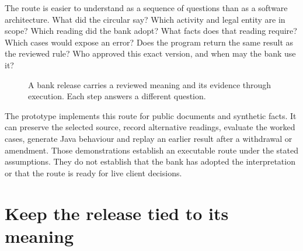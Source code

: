 The route is easier to understand as a sequence of questions than as a software
architecture. What did the circular say? Which activity and legal entity are in
scope? Which reading did the bank adopt? What facts does that reading require?
Which cases would expose an error? Does the program return the same result as the
reviewed rule? Who approved this exact version, and when may the bank use it?

\begin{figure}[htbp]
\centering
{}
\caption{A bank release carries a reviewed meaning and its evidence through
execution. Each step answers a different question.}
\label{fig:reader-implementation-route}
\end{figure}

The prototype implements this route for public documents and synthetic facts. It
can preserve the selected source, record alternative readings, evaluate the
worked cases, generate Java behaviour and replay an earlier result after a
withdrawal or amendment. Those demonstrations establish an executable route
under the stated assumptions. They do not establish that the bank has adopted
the interpretation or that the route is ready for live client decisions.

\section{Keep the release tied to its meaning}

